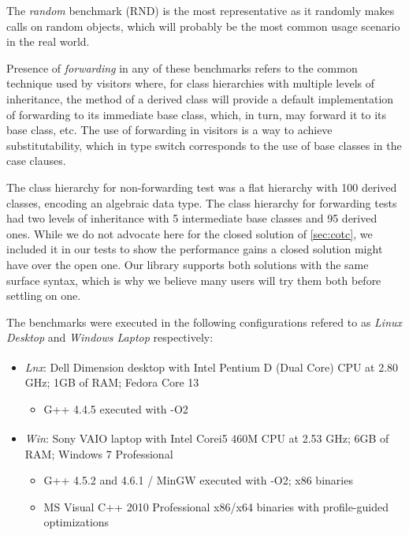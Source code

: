 The \emph{random} benchmark (RND) is the most representative as it randomly makes calls on 
random objects, which will probably be the most common usage scenario in the 
real world.

Presence of \emph{forwarding} in any of these benchmarks refers to the 
common technique used by visitors where, for class hierarchies with multiple 
levels of inheritance, the  method of a derived class will provide a 
default implementation of forwarding to its immediate base class, which, in turn, 
may forward it to its base class, etc. The use of forwarding in visitors is a 
way to achieve substitutability, which in type switch corresponds to the use 
of base classes in the case clauses.

The class hierarchy for non-forwarding test was a flat hierarchy with 100 
derived classes, encoding an algebraic data type. The class hierarchy for 
forwarding tests had two levels of inheritance with 5 intermediate base classes 
and 95 derived ones. While we do not advocate here for the closed solution of 
\textsection\ref{sec:cotc}, we included it in our tests to show the performance 
gains a closed solution might have over the open one. Our library supports both 
solutions with the same surface syntax, which is why we believe many users will 
try them both before settling on one. 

The benchmarks were executed in the following configurations refered to as 
\emph{Linux Desktop} and \emph{Windows Laptop} respectively:

\begin{itemize}
\setlength{\itemsep}{0pt}
\setlength{\parskip}{0pt}
\item \emph{Lnx}: Dell Dimension\textsuperscript{\textregistered} desktop with Intel\textsuperscript{\textregistered} Pentium\textsuperscript{\textregistered} 
      D (Dual Core) CPU at 2.80 GHz; 1GB of RAM; Fedora Core 13  
      \begin{itemize}
      \setlength{\itemsep}{0pt}
      \setlength{\parskip}{0pt}
      \item G++ 4.4.5 executed with -O2
      \end{itemize}
\item \emph{Win}: Sony VAIO\textsuperscript{\textregistered} laptop with Intel\textsuperscript{\textregistered} Core\texttrademark i5 460M 
      CPU at 2.53 GHz; 6GB of RAM; Windows 7 Professional
      \begin{itemize}
      \setlength{\itemsep}{0pt}
      \setlength{\parskip}{0pt}
      \item G++ 4.5.2 and 4.6.1 / MinGW executed with -O2; x86 binaries
      \item MS Visual C++ 2010 Professional x86/x64 binaries with profile-guided optimizations
      \end{itemize}
\end{itemize}

